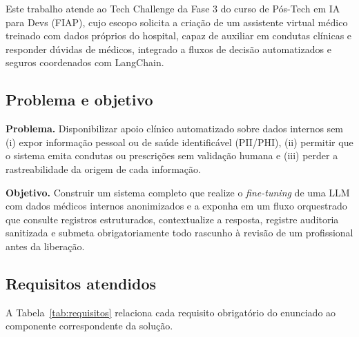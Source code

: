 \documentclass[12pt,a4paper]{article}
\begin{document}
Este trabalho atende ao Tech Challenge da Fase 3 do curso de Pós-Tech em IA para
Devs (FIAP), cujo escopo solicita a criação de um assistente virtual médico
treinado com dados próprios do hospital, capaz de auxiliar em condutas clínicas
e responder dúvidas de médicos, integrado a fluxos de decisão automatizados e
seguros coordenados com LangChain.

\subsection{Problema e objetivo}

\noindent\textbf{Problema.} Disponibilizar apoio clínico automatizado sobre
dados internos sem (i) expor informação pessoal ou de saúde identificável
(PII/PHI), (ii) permitir que o sistema emita condutas ou prescrições sem
validação humana e (iii) perder a rastreabilidade da origem de cada informação.

\noindent\textbf{Objetivo.} Construir um sistema completo que realize o
\emph{fine-tuning} de uma LLM com dados médicos internos anonimizados e a exponha
em um fluxo orquestrado que consulte registros estruturados, contextualize a
resposta, registre auditoria sanitizada e submeta obrigatoriamente todo rascunho
à revisão de um profissional antes da liberação.

\subsection{Requisitos atendidos}

A Tabela~\ref{tab:requisitos} relaciona cada requisito obrigatório do enunciado
ao componente correspondente da solução.
\end{document}
